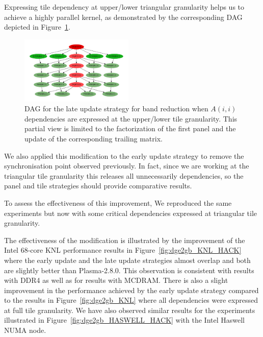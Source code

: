 Expressing tile dependency at upper/lower triangular
granularity helps us to achieve a highly parallel kernel, as
demonstrated by the corresponding DAG depicted in Figure~\ref{fig:dag_hack}.
\begin{figure}
  \begin{center}
    \includegraphics[width=0.48\textwidth]{fig/dag_better}
  \end{center}
  \caption{DAG for the late update strategy for band reduction when
      $A(i,i)$ dependencies are expressed at the upper/lower tile
      granularity. This partial view is limited to the factorization of the
      first panel and the update of the corresponding trailing matrix.}
  \label{fig:dag_hack}
\end{figure}

We also applied this modification to the early update strategy
to remove the synchronisation point observed previously.
In fact, since we are working at the triangular tile granularity this
releases all unnecessarily dependencies,
so the panel and tile strategies should provide comparative results.

To assess the effectiveness of this improvement,
We reproduced the same experiments but now with
some critical dependencies expressed at triangular
tile granularity.

The effectiveness of the modification is illustrated by
the improvement of the Intel 68-core KNL performance
results in Figure~\ref{fig:dge2gb_KNL_HACK} where
the early update and the late update strategies
almost overlap and both are slightly better than Plasma-2.8.0.
This observation is consistent with results with DDR4 as well as
for results with MCDRAM.
There is also a slight improvement in the
performance achieved by the early update strategy
compared to the results in Figure~\ref{fig:dge2gb_KNL} where all dependencies
were expressed at full tile granularity.
We have also observed similar results for the experiments
illustrated in Figure~\ref{fig:dge2gb_HASWELL_HACK} with the Intel Haswell NUMA node.


